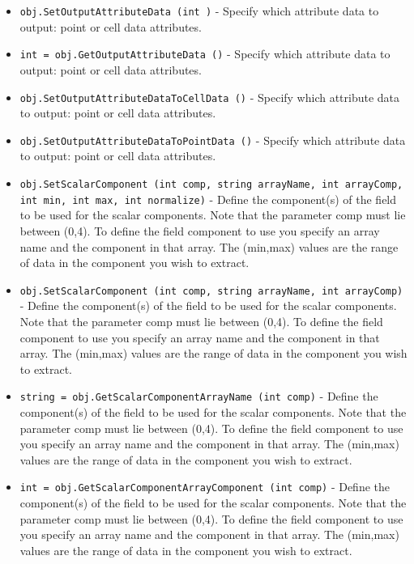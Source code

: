 \begin{itemize}
\item  \verb|obj.SetOutputAttributeData (int )| -  Specify which attribute data to output: point or cell data attributes.

\item  \verb|int = obj.GetOutputAttributeData ()| -  Specify which attribute data to output: point or cell data attributes.

\item  \verb|obj.SetOutputAttributeDataToCellData ()| -  Specify which attribute data to output: point or cell data attributes.

\item  \verb|obj.SetOutputAttributeDataToPointData ()| -  Specify which attribute data to output: point or cell data attributes.

\item  \verb|obj.SetScalarComponent (int comp, string arrayName, int arrayComp, int min, int max, int normalize)| -  Define the component(s) of the field to be used for the scalar
 components.  Note that the parameter comp must lie between (0,4). To
 define the field component to use you specify an array name and the
 component in that array. The (min,max) values are the range of data in
 the component you wish to extract.

\item  \verb|obj.SetScalarComponent (int comp, string arrayName, int arrayComp)| -  Define the component(s) of the field to be used for the scalar
 components.  Note that the parameter comp must lie between (0,4). To
 define the field component to use you specify an array name and the
 component in that array. The (min,max) values are the range of data in
 the component you wish to extract.

\item  \verb|string = obj.GetScalarComponentArrayName (int comp)| -  Define the component(s) of the field to be used for the scalar
 components.  Note that the parameter comp must lie between (0,4). To
 define the field component to use you specify an array name and the
 component in that array. The (min,max) values are the range of data in
 the component you wish to extract.

\item  \verb|int = obj.GetScalarComponentArrayComponent (int comp)| -  Define the component(s) of the field to be used for the scalar
 components.  Note that the parameter comp must lie between (0,4). To
 define the field component to use you specify an array name and the
 component in that array. The (min,max) values are the range of data in
 the component you wish to extract.


\end{itemize}
